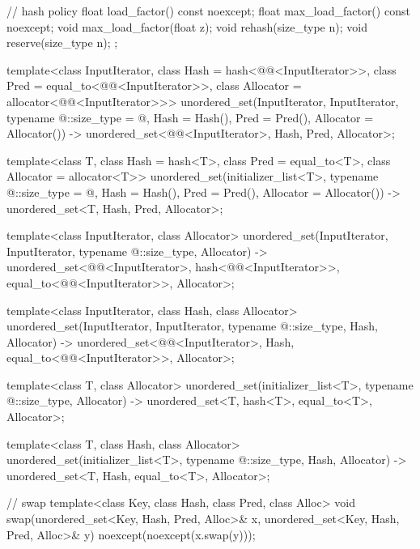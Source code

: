 \begin{codeblock}
{{    // hash policy
    float load_factor() const noexcept;
    float max_load_factor() const noexcept;
    void max_load_factor(float z);
    void rehash(size_type n);
    void reserve(size_type n);
  };

  template<class InputIterator,
           class Hash = hash<@@<InputIterator>>,
           class Pred = equal_to<@@<InputIterator>>,
           class Allocator = allocator<@@<InputIterator>>>
    unordered_set(InputIterator, InputIterator, typename @\seebelow@::size_type = @\seebelow@,
                  Hash = Hash(), Pred = Pred(), Allocator = Allocator())
      -> unordered_set<@@<InputIterator>,
                       Hash, Pred, Allocator>;

  template<class T, class Hash = hash<T>,
           class Pred = equal_to<T>, class Allocator = allocator<T>>
    unordered_set(initializer_list<T>, typename @\seebelow@::size_type = @\seebelow@,
                  Hash = Hash(), Pred = Pred(), Allocator = Allocator())
      -> unordered_set<T, Hash, Pred, Allocator>;

  template<class InputIterator, class Allocator>
    unordered_set(InputIterator, InputIterator, typename @\seebelow@::size_type, Allocator)
      -> unordered_set<@@<InputIterator>,
                       hash<@@<InputIterator>>,
                       equal_to<@@<InputIterator>>,
                       Allocator>;

  template<class InputIterator, class Hash, class Allocator>
    unordered_set(InputIterator, InputIterator, typename @\seebelow@::size_type,
                  Hash, Allocator)
      -> unordered_set<@@<InputIterator>, Hash,
                       equal_to<@@<InputIterator>>,
                       Allocator>;

  template<class T, class Allocator>
    unordered_set(initializer_list<T>, typename @\seebelow@::size_type, Allocator)
      -> unordered_set<T, hash<T>, equal_to<T>, Allocator>;

  template<class T, class Hash, class Allocator>
    unordered_set(initializer_list<T>, typename @\seebelow@::size_type, Hash, Allocator)
      -> unordered_set<T, Hash, equal_to<T>, Allocator>;

  // swap
  template<class Key, class Hash, class Pred, class Alloc>
    void swap(unordered_set<Key, Hash, Pred, Alloc>& x,
              unordered_set<Key, Hash, Pred, Alloc>& y)
      noexcept(noexcept(x.swap(y)));
}
\end{codeblock}

